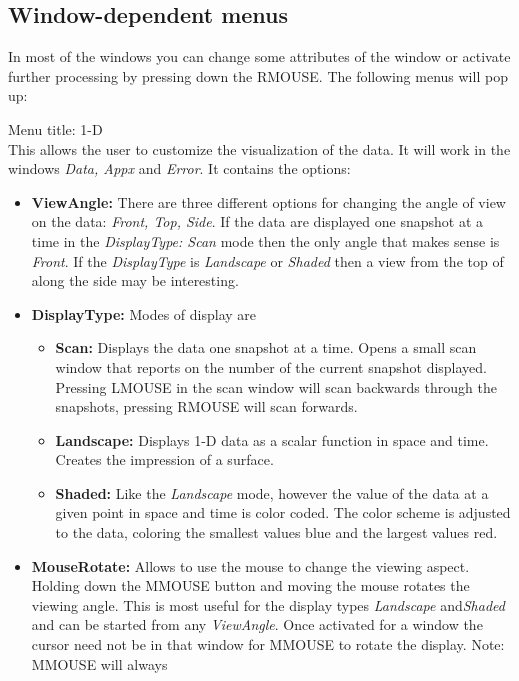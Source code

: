 \subsection{Window-dependent menus}
\label{sec:windowdependentmenus}
In most of the windows you can change some attributes of the window or
activate further processing by pressing down the RMOUSE. The following 
menus will pop up:
\begin{description}
\item{Menu title: {\large  1-D}}\\
This allows the user to customize the visualization of the data.
It will work in the windows {\sl Data, Appx} and {\sl Error}.
It contains the options:
\begin{itemize}
\item{\bf ViewAngle:}  There are three different options for changing the 
	angle of view on the data: {\sl Front, Top, Side}. 
	If the data are displayed one snapshot at a time
	in the {\sl DisplayType: Scan} mode then the only angle that makes sense
	is {\sl Front}. If the {\sl DisplayType} is {\sl Landscape} or {\sl
	Shaded} then a view from the top of along the side may be interesting.
\item{\bf DisplayType:} 
	Modes of display are
	\begin{itemize}
	\item{\bf Scan:}  Displays the data one snapshot at a time. Opens a
	small scan
	window that reports on the number of the current snapshot displayed.
	Pressing LMOUSE 
	in the scan window will scan backwards through the snapshots, pressing
	RMOUSE will scan forwards.
	\item{\bf Landscape:}  Displays 1-D data as a scalar function in space
	and time. Creates the impression of a surface.
	\item{\bf Shaded:}  Like the {\sl Landscape} mode, however the value of
	the data at a given point in space and time is color coded. The color
	scheme is adjusted to the data, coloring the smallest values
	blue and the largest values red.
	\end{itemize}
\item{\bf MouseRotate:}  
	Allows to use the mouse to change the viewing aspect.
	Holding down the MMOUSE button and moving the mouse rotates the
	viewing angle.
	This is most useful for the display types {\sl Landscape}
	and{\sl Shaded} and can be started from any {\sl ViewAngle}.
	Once activated for a window the cursor need not be in that window
	for MMOUSE to rotate the display. Note: MMOUSE will always 

\end{itemize}
\end{description}
